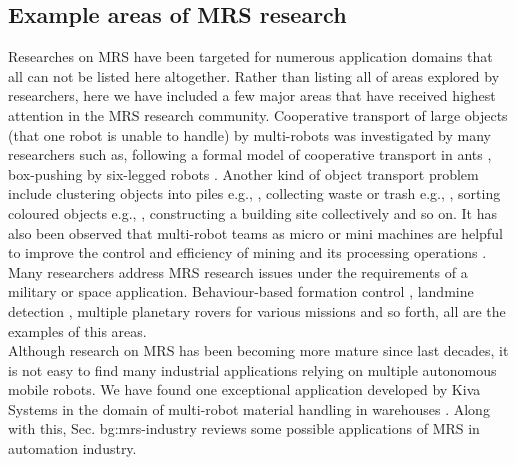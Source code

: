 \subsection*{Example areas of MRS research}
\label{bg:mrs:eg}
Researches on MRS have been targeted for numerous application domains that all can not be listed here altogether. Rather than listing all of areas explored by researchers, here we have included a few major areas that have received highest attention in the MRS research community. 
Cooperative transport of large objects (that one robot is unable to handle) by multi-robots was investigated by many researchers such as, following a formal model of cooperative transport in ants \cite{Kube+1993}, box-pushing by six-legged robots \cite{Mataric+1995}. Another kind of object transport problem include clustering objects into piles e.g., \cite{Beckers+1994}, collecting waste or trash e.g., \cite{Parker1994}, sorting coloured objects e.g., \cite{Melhuish+1998}, constructing a building site collectively \cite{Wawerla+2002} and so on. It has also been observed that multi-robot teams as micro or mini machines are helpful to improve the control and efficiency of mining and its processing operations \cite{Dunbar+2002}. Many researchers address MRS research issues under the requirements of a military or space application. Behaviour-based formation control \cite{Balch+1998}, landmine detection \cite{Franklin+1995}, multiple planetary rovers for various missions \cite{Huntsberger2004} and so forth, all are the examples of this areas.\\
Although research on MRS has been becoming more mature since last decades, it is not easy to find many industrial applications relying on multiple autonomous mobile robots. We have found one exceptional application developed by Kiva Systems in the domain of multi-robot material handling in warehouses \cite{Wurman+2008}. Along with this, Sec. {bg:mrs-industry} reviews some possible applications of MRS in automation industry.
